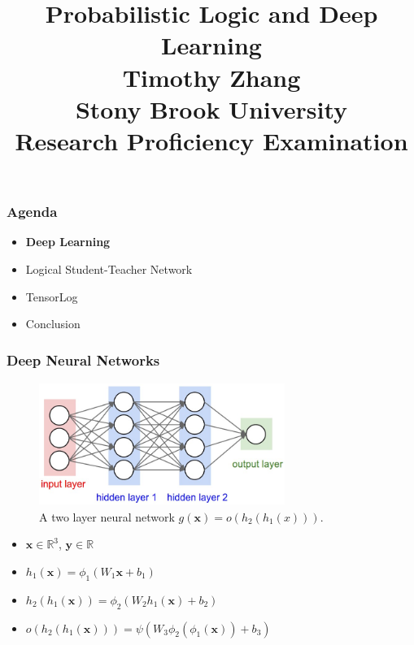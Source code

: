 \documentclass{beamer}
\title{Probabilistic Logic and Deep Learning\\
\large Timothy Zhang\\
Stony Brook University\\
Research Proficiency Examination}
\date{}							%
\begin{document}
	\maketitle
	
\begin{frame}
	\frametitle{Agenda}
	\begin{itemize}
		\item \textbf{Deep Learning}
		\item Logical Student-Teacher Network
		\item TensorLog
		\item Conclusion
	\end{itemize}
\end{frame}

\begin{frame}
\frametitle{Deep Neural Networks}
\begin{figure}
	\begin{center}
		\includegraphics[width=8cm, height=4cm]{dnn}
	\end{center}
	\caption{A two layer neural network $g(\textbf{x}) = o(h_2(h_1(x)))$.}
\end{figure}
\begin{itemize}
	\item $\textbf{x} \in \mathbb{R}^3$, $\textbf{y} \in \mathbb{R}$
	\item $h_1(\textbf{x}) = \phi_1(W_1 \textbf{x} + b_1)$
	\item $h_2(h_1(\textbf{x})) = \phi_2(W_2 h_1(\textbf{x}) + b_2)$
	\item $o(h_2(h_1(\textbf{x}))) = \psi(W_3 \phi_2(\phi_1(\textbf{x})) + b_3)$
\end{itemize}
\end{frame}
\end{document}
